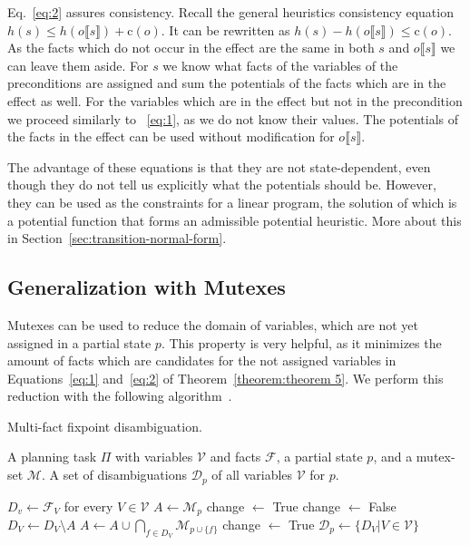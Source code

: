 Eq.~\eqref{eq:2} assures consistency.
Recall the general heuristics consistency equation $h(s)\leq h(o\llbracket s\rrbracket)+\text{c}(o)$.
It can be rewritten as $h(s)-h(o\llbracket s\rrbracket)\leq\text{c}(o)$.
As the facts which do not occur in the effect are the same in both $s$ and $o\llbracket s\rrbracket$ we can leave them aside. %
For $s$ we know what facts of the variables of the preconditions are assigned and sum the potentials of the facts which are in the effect as well.
For the variables which are in the effect but not in the precondition we proceed similarly to ~\eqref{eq:1}, as we do not know their values.
The potentials of the facts in the effect can be used without modification for  $o\llbracket s\rrbracket$.

The advantage of these equations is that they are not state-dependent, even though they do not tell us explicitly what the potentials should be.
However, they can be used as the constraints for a linear program, the solution of which is a potential function that forms an admissible potential heuristic.
More about this in Section~\ref{sec:transition-normal-form}.

\subsection{Generalization with Mutexes}\label{subsec:pot-generalize-with-mutexes}
Mutexes can be used to reduce the domain of variables, which are not yet assigned in a partial state $p$.
This property is very helpful, as it minimizes the amount of facts which are candidates for the not assigned variables in Equations~\eqref{eq:1} and~\eqref{eq:2} of Theorem~\ref{theorem:theorem 5}.
We perform this reduction with the following algorithm~\citep{fivser2020strengthening}.

\begin{algorithm}[H]
    \caption{Multi-fact fixpoint disambiguation.}
    \label{alg:multi-fact}
    \begin{algorithmic}[1] %
        \Require A planning task $\Pi$ with variables $\mathcal{V}$ and facts $\mathcal{F}$, a partial state $p$, and a mutex-set $\mathcal{M}$.
        \Ensure A set of disambiguations $\mathcal{D}_p$ of all variables $\mathcal{V}$ for $p$.

        \State $D_v\leftarrow \mathcal{F}_V$ for every $V\in\mathcal{V}$\;
        \State $A\leftarrow \mathcal{M}_p$\;
        \State change $\leftarrow$ True\;
        \State change $\leftarrow$ False\;
        \State $D_V\leftarrow D_V\setminus A$\;
        \State $A\leftarrow A\cup \bigcap_{f\in D_V}\mathcal{M}_{p\cup \{f\}} $\; \label{lst:line:A}
        \State change $\leftarrow$ True\;
        \EndIf
        \EndFor
        \EndWhile
        \State $\mathcal{D}_p\leftarrow\{D_V|V\in\mathcal{V}\}$\;
    \end{algorithmic}
\end{algorithm}

